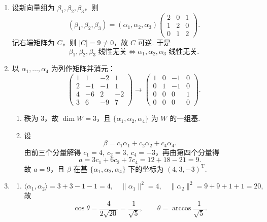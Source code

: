 \begin{enumerate}
    \item 设新向量组为 $\beta_1,\beta_2,\beta_3$，则
    \[
        (\beta_1,\beta_2,\beta_3)
        =(\alpha_1,\alpha_2,\alpha_3)
        \begin{pmatrix}
            2&0&1\\
            1&2&0\\
            0&1&2
        \end{pmatrix}.
    \]
    记右端矩阵为 $C$，则 $|C|=9\neq 0$，故 $C$ 可逆. 于是
    \[
        \beta_1,\beta_2,\beta_3\text{ 线性无关}
        \iff \alpha_1,\alpha_2,\alpha_3\text{ 线性无关}.
    \]

    \item 以 $\alpha_1,\ldots,\alpha_4$ 为列作矩阵并消元：
    \[
        \begin{pmatrix}
            1&1&-2&1\\
            2&-1&-1&1\\
            4&-6&2&-2\\
            3&6&-9&7
        \end{pmatrix}
        \longrightarrow
        \begin{pmatrix}
            1&0&-1&0\\
            0&1&-1&0\\
            0&0&0&1\\
            0&0&0&0
        \end{pmatrix}.
    \]
    \begin{enumerate}
        \item 秩为 $3$，故 $\dim W=3$，且 $\{\alpha_1,\alpha_2,\alpha_4\}$ 为 $W$ 的一组基.

        \item 设
        \[
            \beta=c_1\alpha_1+c_2\alpha_2+c_4\alpha_4.
        \]
        由前三个分量解得 $c_1=4,\ c_2=3,\ c_4=-3$，再由第四个分量得
        \[
            a=3c_1+6c_2+7c_4=12+18-21=9.
        \]
        故 $a=9$，且 $\beta$ 在基 $\{\alpha_1,\alpha_2,\alpha_4\}$ 下的坐标为 $(4,3,-3)^\mathrm{T}$.
    \end{enumerate}

    \item
    \begin{enumerate}
        \item
        \[
            \langle\alpha_1,\alpha_2\rangle=3+3-1-1=4,
            \quad \|\alpha_1\|^2=4,
            \quad \|\alpha_2\|^2=9+9+1+1=20,
        \]
        故
        \[
            \cos\theta=\frac{4}{2\sqrt{20}}=\frac{1}{\sqrt5},
            \qquad \theta=\arccos\frac{1}{\sqrt5}.
        \]


\end{enumerate}
\end{enumerate}
